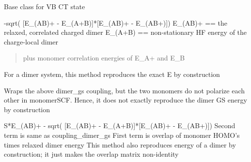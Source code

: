 \documentclass[letterpaper,10pt,english]{sphinxmanual}
\begin{document}
\begin{fulllineitems}
\label{\detokenize{background:ChargeState.ChargeState}}
Base class for VB CT state

\begin{fulllineitems}
\label{\detokenize{background:ChargeState.ChargeState.coupling_dimer_gs}}
-sqrt( {[}E\_(AB)+ - E\_(A+B){]}*{[}E\_(AB)+ - E\_(AB+){]})
E\_(AB)+ == the relaxed, correlated charged dimer
E\_(A+B) == non-stationary HF energy of the charge-local dimer
\begin{quote}

plus monomer correlation energies of E\_A+ and E\_B
\end{quote}

For a dimer system, this method reproduces the exact E by construction

\end{fulllineitems}


\begin{fulllineitems}
\label{\detokenize{background:ChargeState.ChargeState.coupling_dimer_gs_no_embed}}
Wraps the above dimer\_gs coupling, but the two monomers do not
polarize each other in monomerSCF. Hence, it does not exactly
reproduce the dimer GS energy by construction

\end{fulllineitems}


\begin{fulllineitems}
\label{\detokenize{background:ChargeState.ChargeState.coupling_dimer_gs_overlapHOMO}}
S*E\_(AB)+ - sqrt( {[}E\_(AB)+ - E\_(A+B){]}*{[}E\_(AB)+ - E\_(AB+){]})
Second term is same as coupling\_dimer\_gs
First term is overlap of monomer HOMO's times relaxed dimer energy
This method also reproduces energy of a dimer by construction; it
just makes the overlap matrix non-identity


\end{fulllineitems}
\end{fulllineitems}
\end{document}
